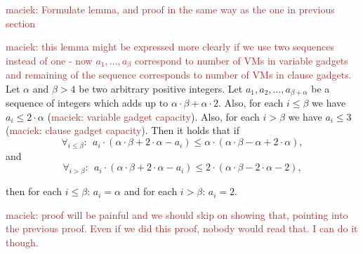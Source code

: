 \documentclass[9pt]{sigcomm-alternate}
\newcommand{\maciek}[1]{\textcolor{brown}{maciek: #1}}
\newcommand{\clauses}{\alpha}
\newcommand{\variables}{\beta}
\begin{document}
\begin{appendix}
\maciek{Formulate lemma, and proof in the same way as the one in previous section}


\begin{lemma}\label{lem:bandwidth-lemma}
\maciek{this lemma might be expressed more clearly if we use two
  sequences instead of one - now $a_1, \ldots, a_{\variables}$
  correspond to number of VMs in variable gadgets and remaining of the
  sequence corresponds to number of VMs in clause gadgets.}
  Let $\clauses$ and $\variables > 4$ be two arbitrary positive integers. Let $a_1, a_2, \ldots,
  a_{\variables+\clauses}$ be a sequence of integers which adds up to
  $\clauses \cdot \variables + \clauses \cdot 2$. Also, for
  each $i \leq \variables$ we have $a_i \leq 2 \cdot \clauses$
  (\maciek{variable gadget capacity}). Also,
  for each $i >\variables$ we have $a_i \leq 3$ (\maciek{clause gadget capacity}). Then it holds that if
  $$ \forall_{i\leq\variables}:~~ a_i \cdot (\clauses \cdot \variables
  + 2\cdot \clauses- a_i) \leq \clauses \cdot (\clauses \cdot \variables -
  \clauses + 2 \cdot \clauses), $$
and
$$ \forall_{i>\variables}:~~ a_i \cdot (\clauses \cdot \variables + 2 \cdot \clauses - a_i) \leq 2 \cdot (\clauses \cdot \variables -
  2 \cdot \clauses - 2), $$

\noindent  then for each $i\leq \variables$: $a_i = \clauses$ and for
each $i>\variables$: $a_i = 2$.
\end{lemma}

\maciek{proof will be painful and we should skip on showing that,
  pointing into the previous proof. Even if we did this proof, nobody
  would read that. I can do it though.}


\end{appendix}
\end{document}
